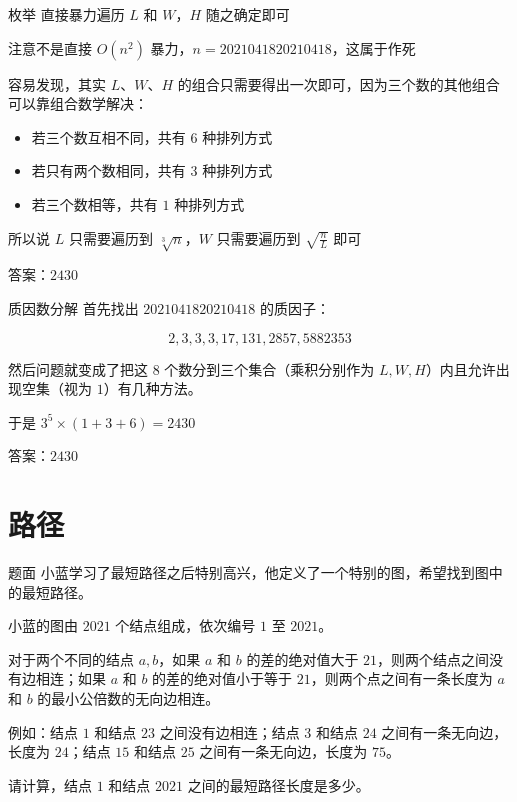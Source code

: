 \documentclass{pptt}
\begin{document}
\begin{frame}{枚举}
    直接暴力遍历 $L$ 和 $W$，$H$ 随之确定即可

    注意不是直接 $O(n^2)$ 暴力，$n=2021041820210418$，这属于作死

    容易发现，其实 $L$、$W$、$H$ 的组合只需要得出一次即可，因为三个数的其他组合可以靠组合数学解决：

    \begin{itemize}
        \item 若三个数互相不同，共有 $6$ 种排列方式
        \item 若只有两个数相同，共有 $3$ 种排列方式
        \item 若三个数相等，共有 $1$ 种排列方式
    \end{itemize}

    所以说 $L$ 只需要遍历到 $\sqrt[3]{n}$，$W$ 只需要遍历到 $\sqrt{\frac{n}{L}}$ 即可

    答案：$2430$
\end{frame}

\begin{frame}{质因数分解}
    首先找出 $2021041820210418$ 的质因子：

    $$2,3,3,3,17,131,2857,5882353$$

    然后问题就变成了把这 $8$ 个数分到三个集合（乘积分别作为 $L,W,H$）内且允许出现空集（视为 $1$）有几种方法。

    于是 $3^5 \times (1+3+6) = 2430$

    答案：$2430$
\end{frame}

\section{路径}

\begin{frame}{题面}
    小蓝学习了最短路径之后特别高兴，他定义了一个特别的图，希望找到图中的最短路径。

    小蓝的图由 $2021$ 个结点组成，依次编号 $1$ 至 $2021$。

    对于两个不同的结点 $a,b$，如果 $a$ 和 $b$ 的差的绝对值大于 $21$，则两个结点之间没有边相连；如果 $a$ 和 $b$ 的差的绝对值小于等于 $21$，则两个点之间有一条长度为 $a$ 和 $b$ 的最小公倍数的无向边相连。

    例如：结点 $1$ 和结点 $23$ 之间没有边相连；结点 $3$ 和结点 $24$ 之间有一条无向边，长度为 $24$；结点 $15$ 和结点 $25$ 之间有一条无向边，长度为 $75$。

    请计算，结点 $1$ 和结点 $2021$ 之间的最短路径长度是多少。
\end{frame}
\end{document}
